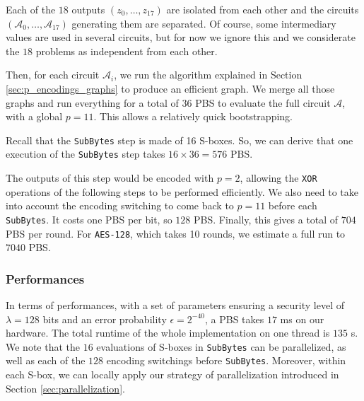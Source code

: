 Each of the $18$ outputs $(z_0, \dots, z_{17})$ are isolated from each other and the circuits $(\mathcal{A}_0, \dots, \mathcal{A}_{17})$ generating them are separated. Of course, some intermediary values are used in several circuits, but for now we ignore this and we considerate the $18$ problems as independent from each other. 

Then, for each circuit $\mathcal{A}_i$, we run the algorithm explained in Section \ref{sec:p_encodings_graphs} to produce an efficient graph. We merge all those graphs and run everything for a total of 36 \gls{PBS} to evaluate the full circuit $\mathcal{A}$, with a global $p = 11$. This allows a relatively quick bootstrapping.

Recall that the \texttt{SubBytes} step is made of 16 \gls{S-box}es. So, we can derive that one execution of the \texttt{SubBytes} step takes $16 \times 36 = 576$ \gls{PBS}. 

The outputs of this step would be encoded with $p=2$, allowing the \texttt{XOR} operations of the following steps to be performed efficiently. We also need to take into account the encoding switching to come back to $p=11$ before each \texttt{SubBytes}. It costs one \gls{PBS} per bit, so $128$ \gls{PBS}. Finally, this gives a total of $704$ \gls{PBS} per round. For \texttt{\gls{AES}-128}, which takes 10 rounds, we estimate a full run to $7040$ \gls{PBS}.

\subsubsection{Performances}

In terms of performances, with a set of parameters ensuring a security level of $\lambda=128$ bits and an error probability $\epsilon=2^{-40}$, a \gls{PBS} takes $17$ ms on our hardware. The total runtime of the whole implementation on one thread is $135$ s. We note that the $16$ evaluations of \gls{S-box}es in \texttt{SubBytes} can be parallelized, as well as each of the $128$ encoding switchings before \texttt{SubBytes}. Moreover, within each \gls{S-box}, we can locally apply our strategy of parallelization introduced in Section \ref{sec:parallelization}.


